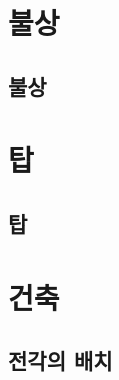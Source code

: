 \documentclass[12pt, a4paper, oneside]{book}
\let\stdsection\section
\renewcommand\section{\newpage\stdsection}
\begin{document}
	\chapter{ 불상 }
	\noptcrule

	\newpage	
	\minitoc



%
	\section{ 불상 }




	\chapter{ 탑 }
	\noptcrule

	\newpage	
	\minitoc


%
	\section{ 탑 }






	\chapter{ 건축 }
	\noptcrule

	\newpage	
	\minitoc


%
	\section{ 전각의 배치 }
\end{document}
